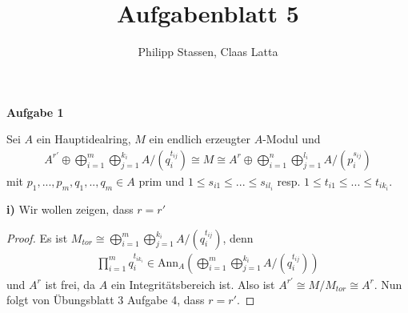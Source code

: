 \documentclass{article}
\title{Aufgabenblatt 5}
\author{Philipp Stassen, Claas Latta}
\theoremstyle{definition}
\theoremstyle{plain}
\theoremstyle{remark}
\newcommand{\aufgabe}[1]{
	{
		\vspace*{0.5cm}
		\textsf{\textbf{Aufgabe #1}}
		\vspace*{0.2cm}

	}
}
\newcommand{\teilaufgabe}[1]{
	{
		\vspace*{0.2cm}
		\textsf{\textbf{#1)}}
	}
}
\begin{document}
\maketitle
\aufgabe1
Sei $A$ ein Hauptidealring, $M$ ein endlich erzeugter $A$-Modul und
\begin{align}
	A^{r'}\oplus\bigoplus_{i=1}^{m}\bigoplus_{j=1}^{k_i}A/(q_i^{t_{ij}})\cong M \cong A^{r}\oplus\bigoplus_{i=1}^{n}\bigoplus_{j=1}^{l_i}A/(p_i^{s_{ij}})
\end{align}
mit $p_1,...,p_m,q_1,..,q_m\in A$ prim und $1\leq s_{i1}\leq ...\leq s_{il_i}$ resp. $1\leq t_{i1}\leq ...\leq t_{ik_i}$.

\teilaufgabe{i} Wir wollen zeigen, dass $r=r'$ 
\begin{proof}
Es ist $M_{tor}\cong\bigoplus_{i=1}^{m}\bigoplus_{j=1}^{k_i}A/(q_i^{t_{ij}})$, denn 
\begin{align}
	\prod_{i=1}^mq_i^{t_{ik_i}}\in\mathrm{Ann}_A\left(\bigoplus_{i=1}^{m}\bigoplus_{j=1}^{k_i}A/(q_i^{t_{ij}})\right)
\end{align}
 und $A^r$ ist frei, da $A$ ein Integritätsbereich ist.
 Also ist $A^{r'}\cong M/M_{tor}\cong A^r$. Nun folgt von Übungsblatt 3 Aufgabe 4, dass $r=r'$.
 \end{proof}
\end{document}
